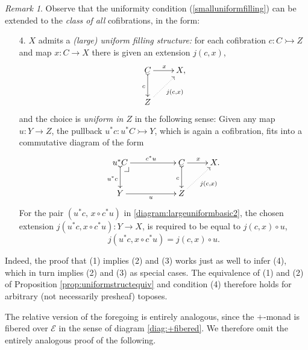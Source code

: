 \documentclass[11pt,reqno]{amsart}
\makeatletter
\newcommand{\EE}{\ensuremath{\mathcal{E}}}
\newcommand{\mono}{\ensuremath{\rightarrowtail}}
\newcommand{\ra}{\ensuremath{\rightarrow}}
\theoremstyle{remark}
\newtheorem{remark}[theorem]{Remark}
\theoremstyle{definition}
\newcommand{\pbcorner}[1][dr]{\save*!/#1-1.2pc/#1:(-1,1)@^{|-}\restore}
\makeatother
\begin{document}
 \begin{remark}\label{remark:largeuniformfilling}
 Observe that the uniformity condition (\ref{smalluniformfilling}) can be extended to the \emph{class of all} cofibrations, in the form:
 
 \begin{enumerate}
 \item[4.]\label{largeuniformfilling} $X$ admits a \emph{(large) uniform filling structure:} 
for each cofibration $c : C \mono Z$ and map $x : C\ra X$ there is given an extension $j(c,x)$,
\begin{equation}\label{diagram:largeuniformbasic}
\xymatrix{
C \ar@{>->}[d]_{c} \ar[r]^{x} & X, \\
Z\ar@{.>}[ru]_{j(c,x)} &
}
\end{equation}
and the choice is \emph{uniform in $Z$} in the following sense:
Given any map $u :Y \ra Z$, the pullback $u^*c : u^*C\mono Y$, which is again a cofibration, fits into a commutative diagram of the form
\begin{equation}\label{diagram:largeuniformbasic2}
\xymatrix{
u^*C \ar@{>->}[d]_{u^*c} \ar[rr]^{c^*u} \pbcorner &&  C \ar@{>->}[d]_{c} \ar[r]^{x} & X. \\
Y \ar[rr]_{u} && Z \ar@{.>}[ru]_{j(c,x)} &
}
\end{equation}
For the pair $(u^*c,\, x\circ c^*u)$ in \eqref{diagram:largeuniformbasic2}, the chosen extension $j(u^*c,x\circ c^*u): Y \ra X$, is required to be equal to  $j(c,x)\circ u$,
\begin{equation}\label{eq:largeuniformfillers}
j(u^*c,x\circ c^*u) = j(c,x) \circ u.
\end{equation}
\end{enumerate}
Indeed, the proof that (1) implies (2) and (3) works just as well to infer (4), which in turn implies (2) and (3) as special cases.   The equivalence of (1) and (2) of Proposition \ref{prop:uniformstructequiv} and condition (4) therefore holds for arbitrary (not necessarily presheaf) toposes.
\end{remark}

The relative version of the foregoing is entirely analogous, since the $+$-monad is fibered over $\EE$ in the sense of diagram \eqref{diag:+fibered}.  We therefore omit the entirely analogous proof of the following.
 
\end{document}

